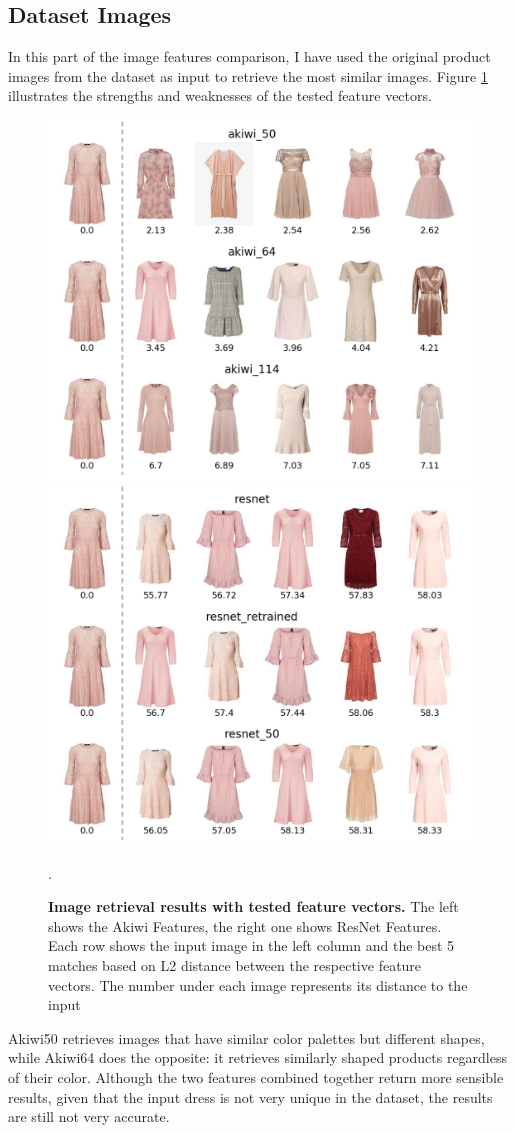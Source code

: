 \documentclass[12pt]{report}
\begin{document}
\subsection{Dataset Images}
In this part of the image features comparison, I have used the original product images from the dataset as input to retrieve the most similar images. Figure \ref{fig:search_pink} illustrates the strengths and weaknesses of the tested feature vectors. 

\begin{figure}[h]
\centering
{\includegraphics[width=.48\linewidth]{04_experiments/retrieval/akiwi_pink}}\hspace{0.2cm}
{\includegraphics[width=.48\linewidth]{04_experiments/retrieval/resnet_pink}}
\caption{\label{fig:search_pink} \textbf{Image retrieval results with tested feature vectors.} The left shows the Akiwi Features, the right one shows ResNet Features. Each row shows the input image in the left column and the best 5 matches based on L2 distance between the respective feature vectors. The number under each image represents its distance to the input}.
\end{figure}

Akiwi50 retrieves images that have similar color palettes but different shapes, while Akiwi64 does the opposite: it retrieves similarly shaped products regardless of their color. Although the two features combined together return more sensible results, given that the input dress is not very unique in the dataset, the results are still not very accurate. 
\end{document}
